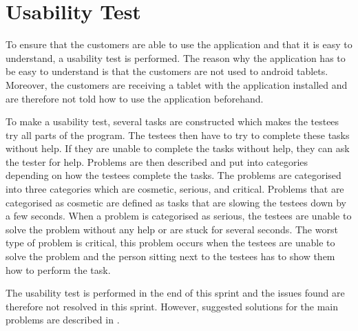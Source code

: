 \section{Usability Test}\label{sec:usability-test}
To ensure that the customers are able to use the application and that it is easy to understand, a usability test is performed.
The reason why the application has to be easy to understand is that the customers are not used to android tablets.
Moreover, the customers are receiving a tablet with the application installed and are therefore not told how to use the application beforehand.

To make a usability test, several tasks are constructed which makes the testees try all parts of the program. 
The testees then have to try to complete these tasks without help.
If they are unable to complete the tasks without help, they can ask the tester for help.
Problems are then described and put into categories depending on how the testees complete the tasks.
The problems are categorised into three categories which are cosmetic, serious, and critical.
Problems that are categorised as cosmetic are defined as tasks that are slowing the testees down by a few seconds.
When a problem is categorised as serious, the testees are unable to solve the problem without any help or are stuck for several seconds.
The worst type of problem is critical, this problem occurs when the testees are unable to solve the problem and the person sitting next to the testees has to show them how to perform the task.

The usability test is performed in the end of this sprint and the issues found are therefore not resolved in this sprint.
However, suggested solutions for the main problems are described in .

